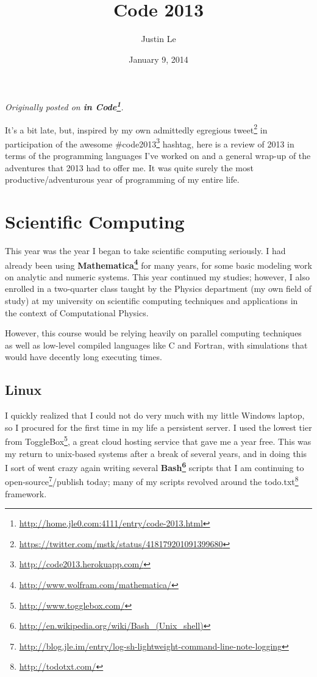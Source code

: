 \documentclass[]{article}
\title{Code 2013}
\author{Justin Le}
\date{January 9, 2014}
\renewcommand{\href}[2]{#2\footnote{\url{#1}}}
\begin{document}
\maketitle

\emph{Originally posted on \textbf{\href{http://home.jle0.com:4111/entry/code-2013.html}{in Code}}.}

It's a bit late, but, inspired by my own admittedly egregious
\href{https://twitter.com/mstk/status/418179201091399680}{tweet} in participation of the awesome
\href{http://code2013.herokuapp.com/}{\#code2013} hashtag, here is a review of 2013 in terms of the
programming languages I've worked on and a general wrap-up of the adventures that 2013 had to offer
me. It was quite surely the most productive/adventurous year of programming of my entire life.

\section{Scientific Computing}\label{scientific-computing}

This year was the year I began to take scientific computing seriously. I had already been using
\textbf{\href{http://www.wolfram.com/mathematica/}{Mathematica}} for many years, for some basic
modeling work on analytic and numeric systems. This year continued my studies; however, I also
enrolled in a two-quarter class taught by the Physics department (my own field of study) at my
university on scientific computing techniques and applications in the context of Computational
Physics.

However, this course would be relying heavily on parallel computing techniques as well as low-level
compiled languages like C and Fortran, with simulations that would have decently long executing
times.

\subsection{Linux}\label{linux}

I quickly realized that I could not do very much with my little Windows laptop, so I procured for
the first time in my life a persistent server. I used the lowest tier from
\href{http://www.togglebox.com/}{ToggleBox}, a great cloud hosting service that gave me a year free.
This was my return to unix-based systems after a break of several years, and in doing this I sort of
went crazy again writing several
\textbf{\href{http://en.wikipedia.org/wiki/Bash_(Unix_shell)}{Bash}} scripts that I am continuing to
\href{http://blog.jle.im/entry/log-sh-lightweight-command-line-note-logging}{open-source}/publish
today; many of my scripts revolved around the \href{http://todotxt.com/}{todo.txt} framework.
\end{document}
